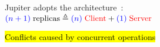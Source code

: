 
\begin{frame}{}
  \centerline{\Huge {}}
\end{frame}

\begin{frame}{}
  \begin{center}
    {\large Jupiter adopts the  architecture~:} \\[3pt]
    {\large $\textcolor{blue}{(n+1)}\; \text{replicas} \triangleq \textcolor{blue}{(n)}\; \text{\textcolor{red}{Client}} + \textcolor{blue}{(1)}\; \text{\textcolor{red}{Server}}$}
  \end{center}

  \begin{center}
    \begin{minipage}{0.50\textwidth}
      
    \end{minipage}
  \end{center}

  \vspace{-1.00cm}
\end{frame}

\begin{frame}{}
  \begin{center}
    {\large {} \hl{Conflicts caused by concurrent operations}} \\[3pt] \pause
    {\small {}}
  \end{center}

  \vspace{-0.50cm}
  \begin{columns}
      \begin{center}
	
      \end{center}
      \begin{center}
	
      \end{center}
  \end{columns}

  \begin{center}
  \end{center}
\end{frame}

